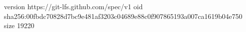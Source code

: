 version https://git-lfs.github.com/spec/v1
oid sha256:00fbdc70828d7bc9e481af3203c04689e88c0f907865193a007ca1619b04e750
size 19220
